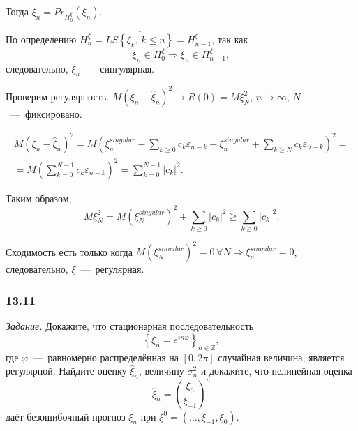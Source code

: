 Тогда $ \xi_n = Pr_{H_0^{ \xi }} \left( \xi_n \right) $.

По определению
$H_n^{ \xi } =
  \overline{LS \left\{ \xi_k, \, k \leq n \right\} } =
  H_{n - 1}^{ \xi }$,
так как
\begin{equation*}
  \xi_n \in H_0^{ \xi } \Rightarrow
  \xi_n \in H_{n - 1}^{ \xi },
\end{equation*}
следовательно, $ \xi_n$~---~сингулярная.

Проверим регулярность.
$M \left( \xi_n - \hat{ \xi }_n \right)^2 \to R \left( 0 \right) = M \xi_N^2, \,
  n \to \infty, \,
  N$~---~фиксировано.

\begin{gather*}
  M \left( \xi_n - \hat{ \xi }_n \right)^2 =
  M \left(
    \xi_n^{singular} - \sum \limits_{k \geq 0} c_k \varepsilon_{n - k} - \xi_n^{singular} +
    \sum \limits_{k \geq N} c_k \varepsilon_{n - k}
  \right)^2 = \\
  = M \left( \sum \limits_{k = 0}^{N - 1} c_k \varepsilon_{n - k} \right)^2 =
  \sum \limits_{k = 0}^{N - 1} \left| c_k \right|^2.
\end{gather*}

Таким образом,
\begin{equation*}
  M \xi_N^2 =
  M \left( \xi_N^{singular} \right)^2 + \sum \limits_{k \geq 0} \left| c_k \right|^2 \geq
  \sum \limits_{k \geq 0} \left| c_k \right|^2.
\end{equation*}

Сходимость есть только когда
$M \left( \xi_N^{singular} \right)^2 = 0 \,
  \forall N \Rightarrow
  \xi_n^{singular} = 0$,
следовательно, $ \xi $~---~регулярная.

\subsubsection*{13.11}

\textit{Задание.}
Докажите,
что стационарная последовательность
\begin{equation*}
  \left\{ \xi_n = e^{in \varphi } \right\}_{n \in \mathbb{Z}},
\end{equation*}
где $ \varphi $~---~равномерно распределённая на $ \left[ 0, 2 \pi \right] $ случайная величина,
является регулярной.
Найдите оценку $ \hat{ \xi }_n$, величину $ \sigma_n^2$ и докажите, что нелинейная оценка
\begin{equation*}
  \hat{ \xi }_n =
  \left( \frac{ \xi_0}{ \xi_{-1}} \right)^n
\end{equation*}
даёт безошибочный прогноз $ \xi_n $ при $ \xi^0 = \left( \dotsc, \xi_{-1}, \xi_0 \right) $.

